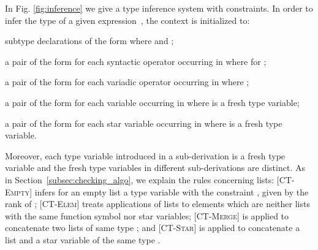 \documentclass{eptcs}
\newcommand{\CTEmpty}{{\small \textsc{CT-Empty}}}
\newcommand{\CTElem}{{\small \textsc{CT-Elem}}}
\newcommand{\CTStar}{{\small \textsc{CT-Star}}}
\newcommand{\CTMerge}{{\small \textsc{CT-Merge}}}
\begin{document}
In Fig. \ref{fig:inference} we give a type inference system with constraints.
In order to infer the type of a given expression~, the context  is initialized to: 
\begin{inparaenum}[1)]
\item subtype declarations of the form  where  and ;
\item a pair of the form  for each
syntactic operator  occurring in  where  for ;
\item a pair of the form  for each variadic
operator  occurring in  where ;
\item a pair of the form  for each variable  occurring in  where  is a fresh type variable;
\item a pair of the form  for each star variable  occurring
in  where  is a fresh type variable.
\end{inparaenum}
Moreover, each type variable introduced in a sub-derivation is a fresh type variable and
the fresh type variables in different sub-derivations are distinct. As in Section~\ref{subsec:checking_algo}, we explain the rules concerning lists: [\CTEmpty] infers for an empty list  a type variable
 with the constraint ,  given by the rank of
; [\CTElem] treats applications of lists to elements which are neither lists
with the same function symbol nor star variables; [\CTMerge] is applied to
concatenate two lists of same type ; and [\CTStar] is applied to
concatenate a list and a star variable of the same type .
\end{document}

